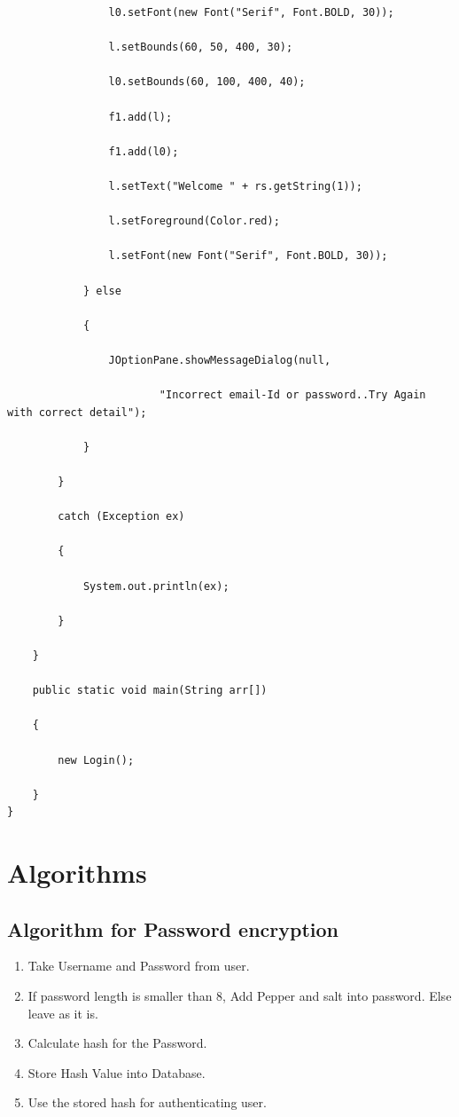 \documentclass[a4paper,12pt]{article}
\begin{document}
\begin{verbatim}
				l0.setFont(new Font("Serif", Font.BOLD, 30));

				l.setBounds(60, 50, 400, 30);

				l0.setBounds(60, 100, 400, 40);

				f1.add(l);

				f1.add(l0);

				l.setText("Welcome " + rs.getString(1));

				l.setForeground(Color.red);

				l.setFont(new Font("Serif", Font.BOLD, 30));

			} else

			{

				JOptionPane.showMessageDialog(null,

						"Incorrect email-Id or password..Try Again with correct detail");

			}

		}

		catch (Exception ex)

		{

			System.out.println(ex);

		}

	}

	public static void main(String arr[])

	{

		new Login();

	}
}

\end{verbatim}
\section{Algorithms}

	
\subsection{Algorithm for Password encryption}
\begin{enumerate}
    \item Take Username and Password from user.
    \item If password length is smaller than 8, Add Pepper and salt into password. Else leave as it is.
    \item Calculate hash for the Password.
    \item Store Hash Value into Database.
    \item Use the stored hash for authenticating user.
    
\end{enumerate}
\end{document}

